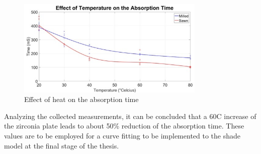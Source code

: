\begin{figure}[H]
	\centering
	\includegraphics[width=0.8\textwidth]{grafiken/AbsorptionTime.jpg}
	\caption{Effect of heat on the absorption time}
	\label{fig:AbsorptionTime}
\end{figure} 

\bigskip

Analyzing the collected measurements, it can be concluded that a 60\textdegree \space C increase of the zirconia plate leads to about 50\% reduction of the absorption time. These values are to be employed for a curve fitting to be implemented to the shade model at the final stage of the thesis.
 
